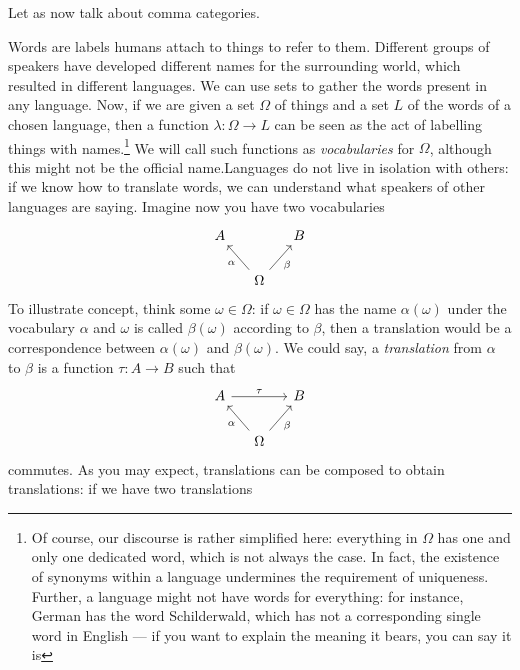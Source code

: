 Let as now talk about comma categories.

\begin{example}
  Words are labels humans attach to things to refer to them. Different
  groups of speakers have developed different names for the
  surrounding world, which resulted in different languages. We can use
  sets to gather the words present in any language. Now, if we are
  given a set \(\Omega\) of things and a set \(L\) of the words of a
  chosen language, then a function \(\lambda : \Omega \to L\) can be
  seen as the act of labelling things with names.\footnote{Of course,
    our discourse is rather simplified here: everything in \(\Omega\)
    has one and only one dedicated word, which is not always the
    case. In fact, the existence of synonyms within a language
    undermines the requirement of uniqueness. Further, a language
    might not have words for everything: for instance, German has the
    word \textgerman{Schilderwald}, which has not a corresponding
    single word in English --- if you want to explain the meaning it
    bears, you can say it is } We will call such functions as
  {\em vocabularies} for \(\Omega\), although this might not be the
  official name.\newline Languages do not live in isolation with
  others: if we know how to translate words, we can understand what
  speakers of other languages are saying. Imagine now you have two
  vocabularies
  \[\begin{tikzcd}[column sep=small]
      A & & B \\
      & \Omega \ar["\alpha", ul] \ar["\beta", ur, swap]
    \end{tikzcd}\] To illustrate concept, think some
  \(\omega \in \Omega\): if \(\omega \in \Omega\) has the name
  \(\alpha(\omega)\) under the vocabulary \(\alpha\) and \(\omega\) is
  called \(\beta(\omega)\) according to \(\beta\), then a translation
  would be a correspondence between \(\alpha(\omega)\) and
  \(\beta(\omega)\). We could say, a {\em translation} from \(\alpha\)
  to \(\beta\) is a function \(\tau : A \to B\) such that
  \[\begin{tikzcd}[column sep=small]
      A \ar["\tau", rr] & & B \\
      & \Omega \ar["\alpha", ul] \ar["\beta", ur, swap]
    \end{tikzcd}\] commutes. As you may expect, translations can be
  composed to obtain translations: if we have two translations

\end{example}
